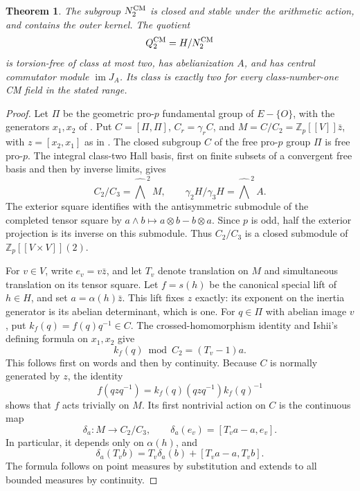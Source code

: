 \documentclass[11pt]{article}
\newtheorem{theorem}{Theorem}[section]
\theoremstyle{definition}\newtheorem{definition}[theorem]{Definition}
\begin{document}
\begin{theorem}\label{thm:cm-measure-class-two}
The subgroup \(N_2^{\rm CM}\) is closed and stable under
the arithmetic action, and contains the outer
kernel.  The quotient
\[
                       Q_2^{\rm CM}=H/N_2^{\rm CM}
\]
is torsion-free of class at most two, has abelianization
\(A\), and has central commutator module
\(\operatorname{im}J_A\).
Its class is exactly two for every class-number-one
CM field in the stated range.
\end{theorem}

\begin{proof}
Let \(\Pi\) be the geometric pro-\(p\) fundamental group
of \(E-\{O\}\), with the generators \(x_1,x_2\)
of \cite[Lemma 2.1]{Ishii}. Put \(C=[\Pi,\Pi]\), \(C_r=\gamma_rC\), and
\(M=C/C_2=\mathbb Z_p[[V]]\bar z\), with
\(z=[x_2,x_1]\) as in \cite[Lemma 2.1]{Ishii}.
The closed subgroup \(C\) of the free pro-\(p\) group
\(\Pi\) is free pro-\(p\).  The integral class-two Hall
basis, first on finite subsets of a convergent free
basis and then by inverse limits, gives
\[
 C_2/C_3=\widehat{\bigwedge}^{\,2}M,
 \qquad \gamma_2H/\gamma_3H=
            \widehat{\bigwedge}^{\,2}A.
\]
The exterior square identifies with the antisymmetric
submodule of the completed tensor square by
\(a\wedge b\mapsto a\otimes b-b\otimes a\).
Since \(p\) is odd, half the exterior projection is
its inverse on this submodule.  Thus
\(C_2/C_3\) is a closed submodule of
\(\mathbb Z_p[[V\times V]](2)\).

For \(v\in V\), write \(e_v=v\bar z\), and let
\(T_v\) denote translation on \(M\) and simultaneous
translation on its tensor square.  Let \(f=s(h)\)
be the canonical special lift of \(h\in H\), and set
\(a=\alpha(h)\bar z\).  This lift fixes \(z\) exactly:
its exponent on the inertia generator is its
abelian determinant, which is one.  For \(q\in\Pi\)
with abelian image \(v\), put
\(k_f(q)=f(q)q^{-1}\in C\).
The crossed-homomorphism identity and Ishii's defining
formula on \(x_1,x_2\) give
\[
                 k_f(q)\bmod C_2=(T_v-1)a.
\]
This follows first on words and then by continuity.
Because \(C\) is normally generated by \(z\), the identity
\[
 f(qzq^{-1})=k_f(q)(qzq^{-1})k_f(q)^{-1}
\]
shows that \(f\) acts trivially on \(M\).  Its first
nontrivial action on \(C\) is the continuous map
\[
 \delta_a:M\longrightarrow C_2/C_3,
 \qquad \delta_a(e_v)=[T_va-a,e_v].
\]
In particular, it depends only on \(\alpha(h)\), and
\begin{equation}\label{eq:cm-delta-translation}
 \delta_a(T_vb)=T_v\delta_a(b)+[T_va-a,T_vb].
\end{equation}
The formula follows on point measures by substitution
and extends to all bounded measures by continuity.


\end{proof}
\end{document}
